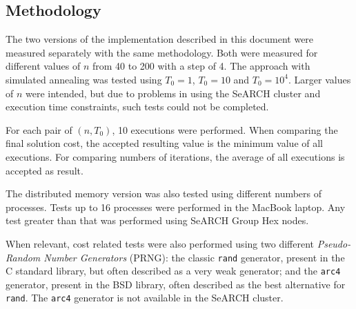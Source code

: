 \subsection{Methodology}
\label{sec:methodology}

The two versions of the implementation described in this document were measured separately with the same methodology. Both were measured for different values of $n$ from 40 to 200 with a step of 4. The approach with simulated annealing was tested using $T_{0}=1$, $T_{0}=10$ and $T_{0}=10^{4}$. Larger values of $n$ were intended, but due to problems in using the SeARCH cluster and execution time constraints, such tests could not be completed.

For each pair of $(n,T_{0})$, 10 executions were performed. When comparing the final solution cost, the accepted resulting value is the minimum value of all executions. For comparing numbers of iterations, the average of all executions is accepted as result.

The distributed memory version was also tested using different numbers of processes. Tests up to 16 processes were performed in the MacBook laptop. Any test greater than that was performed using SeARCH Group Hex nodes.

When relevant, cost related tests were also performed using two different \textit{Pseudo-Random Number Generators} (PRNG): the classic \texttt{rand} generator, present in the C standard library, but often described as a very weak generator; and the \texttt{arc4} generator, present in the BSD library, often described as the best alternative for \texttt{rand}. The \texttt{arc4} generator is not available in the SeARCH cluster.
